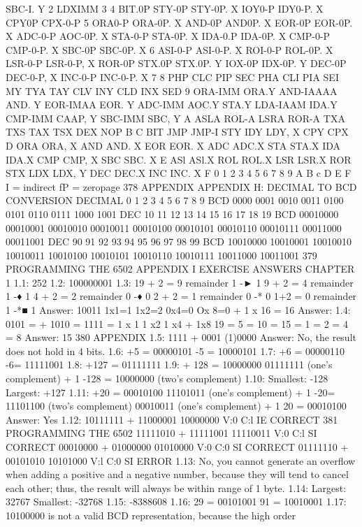 {{{{{{{{{{{{{{{{{{{{{{{{{{{{{{{{{{{{{{{{{{{{{{{{{{{{{{{{{{{{{{{{{{{{{{{{{{{{{{{{{{{{{{{{{{{{{{{{{{{{{{{{{{{{{{{{{{{{{{{{{{{{{{{{{{{{{{{{{{{{SBC-I. Y
2
LDXIMM
3 4
BIT.0P
STY-0P
STY-0P. X
IOY0-P
IDY0-P. X
CPY0P
CPX-0-P
5
ORA0-P
ORA-0P. X
AND-0P
AND0P. X
EOR-0P
EOR-0P. X
ADC-0-P
AOC-0P. X
STA-0-P
STA-0P. X
IDA-0.P
IDA-0P. X
CMP-0-P
CMP-0-P. X
SBC-0P
SBC-0P. X
6
ASI-0-P
ASI-0-P. X
ROI-0-P
ROL-0P. X
LSR-0-P
LSR-0-P, X
ROR-0P
STX.0P
STX.0P. Y
IOX-0P
IDX-0P. Y
DEC-0P
DEC-0-P, X
INC-0-P
INC-0-P. X
7
8
PHP
CLC
PIP
SEC
PHA
CLI
PIA
SEI
MY
TYA
TAY
CLV
INY
CLD
INX
SED
9
ORA-IMM
ORA.Y
AND-IAAAA
AND. Y
EOR-IMAA
EOR. Y
ADC-IMM
AOC.Y
STA.Y
LDA-IAAM
IDA.Y
CMP-IMM
CAAP, Y
SBC-IMM
SBC, Y
A
ASLA
ROL-A
LSRA
ROR-A
TXA
TXS
TAX
TSX
DEX
NOP
B C
BIT
JMP
JMP-I
STY
IDY
LDY, X
CPY
CPX
D
ORA
ORA, X
AND
AND. X
EOR
EOR. X
ADC
ADC.X
STA
STA.X
IDA
IDA.X
CMP
CMP, X
SBC
SBC. X
E
ASl
ASl.X
ROL
ROL.X
LSR
LSR.X
ROR
STX
LDX
LDX, Y
DEC
DEC.X
INC
INC. X
F
0
1
2
3
4
5
6
7
8
9
A
B
c
D
E
F
I = indirect
fP = zeropage
378
APPENDIX
APPENDIX H:
DECIMAL TO BCD CONVERSION
DECIMAL
0
1
2
3
4
5
6
7
8
9
BCD
0000
0001
0010
0011
0100
0101
0110
0111
1000
1001
DEC
10
11
12
13
14
15
16
17
18
19
BCD
00010000
00010001
00010010
00010011
00010100
00010101
00010110
00010111
00011000
00011001
DEC
90
91
92
93
94
95
96
97
98
99
BCD
10010000
10010001
10010010
10010011
10010100
10010101
10010110
10010111
10011000
10011001
379
PROGRAMMING THE 6502
APPENDIX I
EXERCISE ANSWERS
CHAPTER 1
1.1: 252
1.2: 100000001
1.3: 19 + 2 = 9 remainder 1 -► 1
9 + 2 = 4 remainder 1 -♦ 1
4 + 2 = 2 remainder 0 -♦ 0
2 + 2 = 1 remainder 0 -* 0
1+2 = 0 remainder 1 -*■ 1
Answer: 10011
1x1=1
1x2=2
0x4=0
Ox 8=0
+ 1 x 16 = 16
Answer:
1.4: 0101 =
+ 1010 =
1111 =
1 x 1
1 x2
1 x4
+ 1x8
19
= 5
= 10
= 15
= 1
= 2
= 4
= 8
Answer: 15
380
APPENDIX
1.5: 1111
+ 0001
(1)0000
Answer: No, the result does not hold in 4 bits.
1.6: +5 = 00000101
-5 = 10000101
1.7: +6 = 00000110
-6= 11111001
1.8: +127 = 01111111
1.9: + 128 = 10000000
01111111 (one's complement)
+ 1
-128 = 10000000 (two's complement)
1.10: Smallest: -128
Largest: +127
1.11: +20 = 00010100
11101011 (one's complement)
+ 1
-20= 11101100 (two's complement)
00010011 (one's complement)
+ 1
20 = 00010100
Answer: Yes
1.12: 10111111
+ 11000001
10000000
V:0 C:l
IE CORRECT
381
PROGRAMMING THE 6502
11111010
+ 11111001
11110011
V:0 C:l
SI CORRECT
00010000
+ 01000000
01010000
V:0 C:0
SI CORRECT
01111110
+ 00101010
10101000
V:l C:0
SI ERROR
1.13: No, you cannot generate an overflow when adding a positive and a
negative number, because they will tend to cancel each other; thus,
the result will always be within range of 1 byte.
1.14: Largest: 32767
Smallest: -32768
1.15: -8388608
1.16: 29 = 00101001
91 = 10010001
1.17: 10100000 is not a valid BCD representation, because the high order
}}}}}}}}}}}}}}}}}}}}}}}}}}}}}}}}}}}}}}}}}}}}}}}}}}}}}}}}}}}}}}}}}}}}}}}}}}}}}}}}}}}}}}}}}}}}}}}}}}}}}}}}}}}}}}}}}}}}}}}}}}}}}}}}}}}}}}}}}}}}
